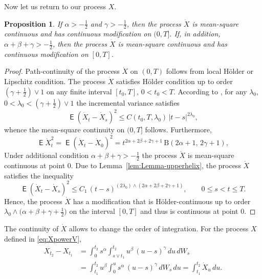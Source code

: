 \documentclass{article}
\DeclareMathOperator{\ME}{\mathsf{E}}
\newcommand{\dotX}{\dot{X}}
\theoremstyle{plain}
\newtheorem{prop}{Proposition}
\theoremstyle{remark}
\theoremstyle{definition}
\begin{document}
Now let us return to our process $X$.

\begin{prop}\label{prop3}
If $\alpha>-\frac12$ and $\gamma>-\frac12$,
then the process $\dotX$ is mean-square continuous
and has continuous modification on $(0,T]$.
If, in addition, $\alpha+\beta+\gamma>-\frac12$,
then the process $\dotX$ is mean-square continuous
and has continuous modification on $[0,T]$.
\end{prop}

\begin{proof}
Path-continuity of the process $\dotX$ on $(0,T)$
follows from local H\"older or Lipschitz condition.
The process $\dotX$ satisfies H\"older condition
up to order $(\gamma+\frac12)\vee 1$ on any finite
interval  $[t_0,T]$, $0<t_0<T$.
According to \cite[Theorem 1]{ASVY2014},
for any $\lambda_0$,
$0<\lambda_0 <(\gamma+\frac12)\vee 1$
the incremental variance satisfies
\[
\ME(\dotX_t - \dotX_s)^2
\le C(t_0, T, \lambda_0) \, |t-s|^{2\lambda_0},
\]
whence the mean-square continuity on $(0,T]$ follows.
Furthermore,
\[
\ME \dotX_t^2 =  \ME(\dotX_t - \dotX_0)^2 =
t^{2\alpha+2\beta+2\gamma+1} \, \mathrm{B}(2\alpha{+}1, \, 2\gamma{+}1),
\]
Under additional condition $\alpha+\beta+\gamma>-\frac12$
the process $\dotX$ is mean-square continuous at point $0$.
Due to Lemma~\ref{lem:Lemma-upperhelix},
the process $\dotX$ satisfies the inequality
\[
\ME(\dotX_t - \dotX_s)^2 \le
C_1 \, (t-s)^{(2\lambda_0) \wedge (2\alpha+2\beta+2\gamma+1)},
\qquad 0\mathbin{\le}s\mathbin{<}t\mathbin{\le}T .
\]
Hence, the process $\dotX$ has a modification that is
H\"older-continuous up to order $\lambda_0 \wedge \bigl(\alpha+\beta+\gamma+\frac12
\bigr)$ on the interval $[0,T]$ and thus is continuous at point $0$.
\end{proof}


The continuity of $\dotX$ allows to change the order of integration.
For the process $X$ defined in \eqref{eq:XpowerV},
\begin{align*}
X_{t_2}-X_{t_1}
&=
\int_0^{t_2} s^\alpha \int_{s\vee t_1}^{t_2} u^\beta \, (u-s)^\gamma \, du \, dW_s
\\ &=
\int_{t_1}^{t_2} u^\beta \int_0^u s^\alpha \, (u-s)^\gamma \, dW_s \, du
= \int_{t_1}^{t_2} \dotX_u \, du .
\end{align*}
\end{document}

